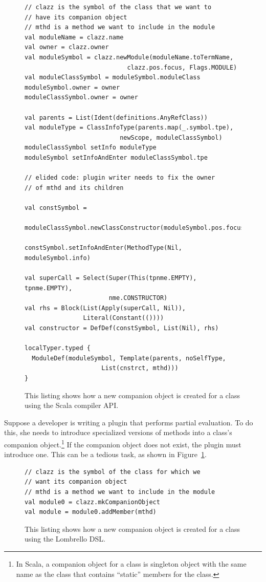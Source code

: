 \documentclass{article}
\begin{document}
\begin{figure}[tp]
\begin{lstlisting}
// clazz is the symbol of the class that we want to
// have its companion object
// mthd is a method we want to include in the module
val moduleName = clazz.name
val owner = clazz.owner
val moduleSymbol = clazz.newModule(moduleName.toTermName,
                            clazz.pos.focus, Flags.MODULE)
val moduleClassSymbol = moduleSymbol.moduleClass
moduleSymbol.owner = owner
moduleClassSymbol.owner = owner

val parents = List(Ident(definitions.AnyRefClass))
val moduleType = ClassInfoType(parents.map(_.symbol.tpe), 
                          newScope, moduleClassSymbol)
moduleClassSymbol setInfo moduleType
moduleSymbol setInfoAndEnter moduleClassSymbol.tpe

// elided code: plugin writer needs to fix the owner
// of mthd and its children

val constSymbol = 
  moduleClassSymbol.newClassConstructor(moduleSymbol.pos.focus)

constSymbol.setInfoAndEnter(MethodType(Nil, moduleSymbol.info)

val superCall = Select(Super(This(tpnme.EMPTY), tpnme.EMPTY),
                       nme.CONSTRUCTOR)
val rhs = Block(List(Apply(superCall, Nil)),
                Literal(Constant(())))
val constructor = DefDef(constSymbol, List(Nil), rhs)

localTyper.typed {
  ModuleDef(moduleSymbol, Template(parents, noSelfType,
                     List(cnstrct, mthd)))
}
\end{lstlisting}
\caption{This listing shows how a new companion object is created for a class
using the Scala compiler API.}
\label{lst:scala_introduceModule}
\end{figure}

Suppose a developer is writing a plugin that performs partial evaluation.  To
do this, she needs to introduce specialized versions of methods into a class's
companion object.\footnote{In Scala, a companion object for a class is
  singleton object with the same name as the class that contains ``static''
  members for the class.} If the companion object does not exist, the plugin
must introduce one.  This can be a tedious task, as shown in
Figure~\ref{lst:scala_introduceModule}.


\begin{figure}[tp]
\begin{lstlisting}
// clazz is the symbol of the class for which we
// want its companion object
// mthd is a method we want to include in the module
val module0 = clazz.mkCompanionObject
val module = module0.addMember(mthd)
\end{lstlisting}
\caption{This listing shows how a new companion object is created for a class
using the Lombrello DSL.}
\label{lst:lombrello_introduceModule}
\end{figure}
\end{document}
